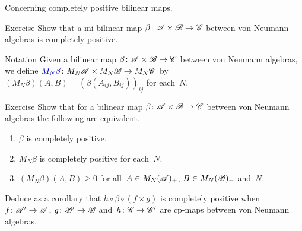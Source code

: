 \documentclass[a]{subfiles}
\begin{document}
\begin{parsec}%
\begin{point}%
Concerning completely positive
bilinear maps.
\end{point}
\begin{point}{Exercise}%
Show that a mi-bilinear
map $\beta\colon \mathscr{A}\times\mathscr{B}\to\mathscr{C}$ between von Neumann 
algebras is completely positive.
\end{point}
\begin{point}{Notation}%
Given a bilinear map
$\beta\colon \mathscr{A}\times\mathscr{B}\to\mathscr{C}$
between von Neumann algebras,
we define
$\Define{M_N\beta}\colon M_N\scrA\times M_N\scrB\to M_N\scrC$
by  $(M_N\beta)(A,B) = 
(\beta(A_{ij},B_{ij}))_{ij}$
for each~$N$.
\end{point}
\begin{point}[cp-bilinear]{Exercise}%
Show that for a bilinear map $\beta\colon \mathscr{A}\times\mathscr{B}\to\mathscr{C}$
between von Neumann algebras
the following are equivalent.
\begin{enumerate}
\item
$\beta$ is completely positive.
\item
$M_N\beta$ is completely positive
for each~$N$.
\item
$(M_N\beta)(A,B)\geq 0$
for all~$A\in M_N(\mathscr{A})_+$, $B\in M_N(\mathscr{B})_+$ and~$N$.
\end{enumerate}
Deduce 
as a corollary that $h\circ \beta \circ (f\times g)$
is completely positive
when~$f\colon \mathscr{A}'\to\mathscr{A}$,
$g\colon \mathscr{B}'\to\mathscr{B}$
and~$h\colon \mathscr{C}\to\mathscr{C}'$
are cp-maps between von Neumann algebras.
\end{point}
\end{parsec}
\end{document}
